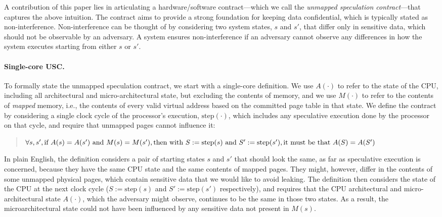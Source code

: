 
A contribution of this paper lies in articulating a hardware/software
contract---which we call the \emph{unmapped speculation contract}---that
captures the above intuition.  The contract aims to provide a strong
foundation for keeping data confidential, which is typically stated as
non-interference.  Non-interference can be thought of by considering
two system states, $s$ and $s'$, that differ only in sensitive data,
which should not be observable by an adversary.  A system ensures
non-interference if an adversary cannot observe any differences in how
the system executes starting from either $s$ or $s'$.

\paragraph{Single-core USC.} To formally state the unmapped speculation contract, we start with a
single-core definition.  We use $A(\cdot)$ to refer to the state of
the CPU, including all architectural and micro-architectural state,
but excluding the contents of memory, and we use $M(\cdot)$ to refer
to the contents of \emph{mapped} memory, i.e., the contents of every
valid virtual address based on the committed page table in that state.
We define the contract by considering a single clock cycle of the
processor's execution, $\textrm{step}(\cdot)$, which includes any
speculative execution done by the processor on that cycle, and require
that unmapped pages cannot influence it:

\begin{small}
\begin{quote}
$\forall s, s', \\
  \textrm{if~} A(s) = A(s')
  \textrm{~and~} M(s) = M(s'), \\
  \textrm{then~with~} S := \textrm{step}(s)
  \textrm{~and~} S' := \textrm{step}(s'), \\
  \textrm{it~must~be~that~} A(S) = A(S')$
\end{quote}
\end{small}

In plain English, the definition considers a pair of starting states $s$
and $s'$ that should look the same, as far as speculative execution is
concerned, because they have the same CPU state and the same contents
of mapped pages.  They might, however, differ in the contents of some
unmapped physical pages, which contain sensitive data that we would
like to avoid leaking.  The definition then considers the state of
the CPU at the next clock cycle ($S := \textrm{step}(s)$ and $S' :=
\textrm{step}(s')$ respectively), and requires that the CPU architectural
and micro-architectural state $A(\cdot)$, which the adversary might
observe, continues to be the same in those two states.  As a result,
the microarchitectural state could not have been influenced by any
sensitive data not present in $M(s)$.


